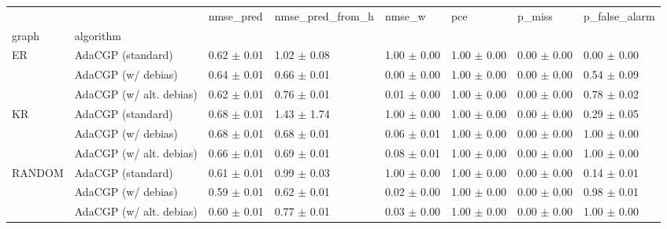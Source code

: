 \begin{tabular}{llllllll}
\toprule
       &                         &        nmse_pred & nmse_pred_from_h &           nmse_w &              pce &           p_miss &    p_false_alarm \\
graph & algorithm &                  &                  &                  &                  &                  &                  \\
\midrule
ER & AdaCGP (standard) &  0.62 $\pm$ 0.01 &  1.02 $\pm$ 0.08 &  1.00 $\pm$ 0.00 &  1.00 $\pm$ 0.00 &  0.00 $\pm$ 0.00 &  0.00 $\pm$ 0.00 \\
       & AdaCGP (w/ debias) &  0.64 $\pm$ 0.01 &  0.66 $\pm$ 0.01 &  0.00 $\pm$ 0.00 &  1.00 $\pm$ 0.00 &  0.00 $\pm$ 0.00 &  0.54 $\pm$ 0.09 \\
       & AdaCGP (w/ alt. debias) &  0.62 $\pm$ 0.01 &  0.76 $\pm$ 0.01 &  0.01 $\pm$ 0.00 &  1.00 $\pm$ 0.00 &  0.00 $\pm$ 0.00 &  0.78 $\pm$ 0.02 \\
KR & AdaCGP (standard) &  0.68 $\pm$ 0.01 &  1.43 $\pm$ 1.74 &  1.00 $\pm$ 0.00 &  1.00 $\pm$ 0.00 &  0.00 $\pm$ 0.00 &  0.29 $\pm$ 0.05 \\
       & AdaCGP (w/ debias) &  0.68 $\pm$ 0.01 &  0.68 $\pm$ 0.01 &  0.06 $\pm$ 0.01 &  1.00 $\pm$ 0.00 &  0.00 $\pm$ 0.00 &  1.00 $\pm$ 0.00 \\
       & AdaCGP (w/ alt. debias) &  0.66 $\pm$ 0.01 &  0.69 $\pm$ 0.01 &  0.08 $\pm$ 0.01 &  1.00 $\pm$ 0.00 &  0.00 $\pm$ 0.00 &  1.00 $\pm$ 0.00 \\
RANDOM & AdaCGP (standard) &  0.61 $\pm$ 0.01 &  0.99 $\pm$ 0.03 &  1.00 $\pm$ 0.00 &  1.00 $\pm$ 0.00 &  0.00 $\pm$ 0.00 &  0.14 $\pm$ 0.01 \\
       & AdaCGP (w/ debias) &  0.59 $\pm$ 0.01 &  0.62 $\pm$ 0.01 &  0.02 $\pm$ 0.00 &  1.00 $\pm$ 0.00 &  0.00 $\pm$ 0.00 &  0.98 $\pm$ 0.01 \\
       & AdaCGP (w/ alt. debias) &  0.60 $\pm$ 0.01 &  0.77 $\pm$ 0.01 &  0.03 $\pm$ 0.00 &  1.00 $\pm$ 0.00 &  0.00 $\pm$ 0.00 &  1.00 $\pm$ 0.00 \\
\bottomrule
\end{tabular}
